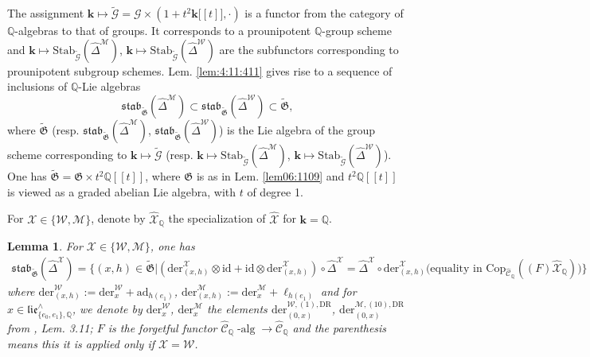 \documentclass[10pt]{amsart}
\newcommand{\DR}{\mathrm{DR}}
\newtheorem{lem}[thm]{Lemma}
\numberwithin{equation}{subsection}
\begin{document}
The assignment $\mathbf k\mapsto {\tilde{\mathcal G}}=\mathcal G\times (1+t^2\mathbf k\mathbf [[t]],\cdot)$ is a functor from the 
category of $\mathbb Q$-algebras to that of groups. It corresponds to a prounipotent $\mathbb Q$-group scheme and 
$\mathbf k\mapsto \mathrm{Stab}_{{\tilde{\mathcal G}}}(\hat\Delta^{\mathcal M})$, 
$\mathbf k\mapsto \mathrm{Stab}_{{\tilde{\mathcal G}}}(\hat\Delta^{\mathcal W})$ 
are the subfunctors corresponding to prounipotent subgroup schemes. Lem. \ref{lem:4:11:411} gives rise to a sequence of inclusions 
of $\mathbb Q$-Lie algebras 
\begin{equation}\label{inclusions:1312:BIS}
\mathfrak{stab}_{\tilde{\mathfrak G}}(\hat\Delta^{\mathcal M})\subset \mathfrak{stab}_{\tilde{\mathfrak G}}(\hat\Delta^{\mathcal W})
\subset \tilde{\mathfrak G},  
\end{equation}
where $\tilde{\mathfrak G}$ (resp. $\mathfrak{stab}_{\tilde{\mathfrak G}}(\hat\Delta^{\mathcal M})$, 
$\mathfrak{stab}_{\tilde{\mathfrak G}}(\hat\Delta^{\mathcal W})$) is the Lie algebra of the group scheme corresponding to $\mathbf k\mapsto {\tilde{\mathcal G}}$ 
(resp. $\mathbf k\mapsto \mathrm{Stab}_{{\tilde{\mathcal G}}}(\hat\Delta^{\mathcal M})$, 
$\mathbf k\mapsto \mathrm{Stab}_{{\tilde{\mathcal G}}}(\hat\Delta^{\mathcal W})$). One has 
$\tilde{\mathfrak G}=\mathfrak G\times t^2\mathbb Q[[t]]$, where $\mathfrak G$ is as in Lem. \ref{lem06:1109} and 
$t^2\mathbb Q[[t]]$ is viewed as a graded abelian Lie algebra, with $t$ of degree 1. 

For $\mathcal X\in\{\mathcal W,\mathcal M\}$, denote by $\hat{\mathcal X}_{\mathbb Q}$ the 
specialization of $\hat{\mathcal X}$ for $\mathbf k=\mathbb Q$.

\begin{lem}\label{lem:comp:stabs:BIS}
For $\mathcal X\in\{\mathcal W,\mathcal M\}$, one has 
 \begin{align*}
\mathfrak{stab}_{\tilde{\mathfrak G}}(\hat\Delta^{\mathcal X})=\{(x,h)\in \tilde{\mathfrak G}|
(\mathrm{der}_{(x,h)}^{\mathcal X}\otimes \mathrm{id}+\mathrm{id}\otimes \mathrm{der}_{(x,h)}^{\mathcal X})\circ\hat\Delta^{\mathcal 
X}=\hat\Delta^{\mathcal X}\circ \mathrm{der}_{(x,h)}^{\mathcal X}
\text{(equality in $\mathrm{Cop}_{\hat{\mathcal C}_{\mathbb Q}}((F)\hat{\mathcal X}_{\mathbb Q})$)}\}
\end{align*}
where $\mathrm{der}_{(x,h)}^{\mathcal W}:=\mathrm{der}_{x}^{\mathcal W}+\mathrm{ad}_{h(e_1)}$, 
$\mathrm{der}_{(x,h)}^{\mathcal M}:=\mathrm{der}_{x}^{\mathcal M}+\ell_{h(e_1)}$ and 
for $x\in\mathfrak{lie}_{\{e_0,e_1\},\mathbb Q}^\wedge$, we denote by $\mathrm{der}_x^{\mathcal W}$, 
$\mathrm{der}_x^{\mathcal M}$ the elements 
$\mathrm{der}_{(0,x)}^{\mathcal W,(1),\DR}$, $\mathrm{der}_{(0,x)}^{\mathcal M,(10),\DR}$ from \cite{EF2}, Lem. 3.11; 
$F$ is the forgetful functor $\hat{\mathcal C}_{\mathbb Q}\operatorname{-alg}\to\hat{\mathcal C}_{\mathbb Q}$
and the parenthesis means this it is applied only if $\mathcal X=\mathcal W$.  
\end{lem}
\end{document}
